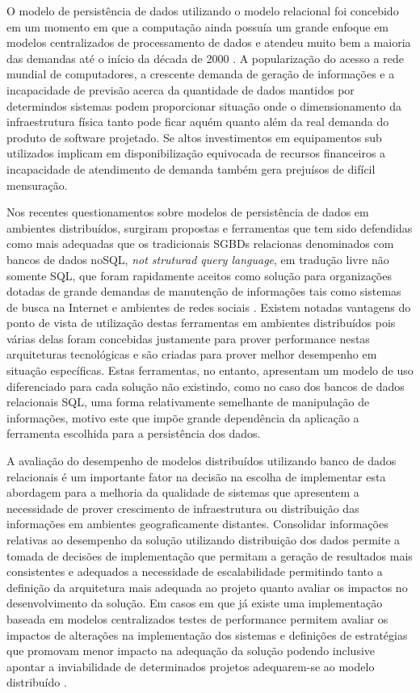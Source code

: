 \documentclass[12pt, a4paper]{article}
\begin{document}
O modelo de persistência de dados utilizando o modelo relacional 
foi concebido em um momento em que a computação ainda possuía um grande enfoque em modelos centralizados
de processamento de dados e atendeu muito bem a maioria das demandas até o início da década de 2000 \cite{kossmann2000state}.
A popularização do acesso a rede mundial de computadores, a crescente demanda de geração de informações
e a incapacidade de previsão acerca da quantidade de dados mantidos por determindos sistemas podem
proporcionar situação onde o dimensionamento da infraestrutura física tanto pode ficar aquém quanto
além da real demanda do produto de software projetado. Se altos investimentos em equipamentos sub utilizados
implicam em disponibilização equivocada de recursos financeiros a incapacidade de atendimento de
demanda também gera prejuísos de difícil mensuração.

Nos recentes questionamentos sobre modelos de persistência de dados em ambientes distribuídos, surgiram 
propostas e ferramentas que tem sido defendidas como mais adequadas que os tradicionais SGBDs relacionas
denominados com bancos de dados noSQL, \textit{not struturad query language}, em tradução livre não somente SQL, que foram
rapidamente aceitos como solução para organizações dotadas de grande demandas de manutenção de informações
tais como sistemas de busca na Internet e ambientes de redes sociais \cite{cattell2011scalable}. Existem notadas vantagens do ponto
de vista de utilização destas ferramentas em ambientes distribuídos pois várias delas foram concebidas
justamente para prover performance nestas arquiteturas tecnológicas e são criadas para prover melhor
desempenho em situação específicas. Estas ferramentas, no entanto, apresentam um modelo de uso diferenciado
para cada solução não existindo, como no caso dos bancos de dados relacionais SQL, uma forma relativamente
semelhante de manipulação de informações, motivo este que impõe grande dependência da aplicação a
ferramenta escolhida para a persistência dos dados.

A avaliação do desempenho de modelos distribuídos utilizando banco de dados relacionais é um importante
fator na decisão na escolha de implementar esta abordagem para a melhoria da qualidade de sistemas
que apresentem a necessidade de prover crescimento de infraestrutura ou distribuição das informações 
em ambientes geograficamente distantes. Consolidar informações relativas ao desempenho da solução 
utilizando distribuição dos dados permite a tomada de decisões de implementação que permitam a 
geração de resultados mais consistentes e adequados a necessidade de escalabilidade permitindo tanto
a definição da arquitetura mais adequada ao projeto quanto avaliar os impactos no desenvolvimento
da solução. Em casos em que já existe uma implementação baseada em modelos centralizados testes de 
performance permitem avaliar os impactos de alterações na implementação dos sistemas e definições
de estratégias que promovam menor impacto na adequação da solução podendo inclusive apontar a inviabilidade
de determinados projetos adequarem-se ao modelo distribuído \cite{lin2011tenzing}.
\end{document}
